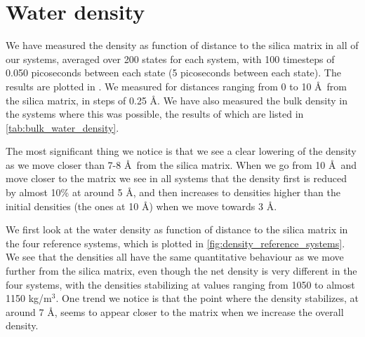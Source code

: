 \section{Water density\label{sec:results_density}}

We have measured the density as function of distance to the silica matrix in all of our systems, averaged over 200 states for each system, with 100 timesteps of 0.050 picoseconds between each state (5 picoseconds between each state). The results are plotted in . We measured for distances ranging from 0 to 10 \AA\ from the silica matrix, in steps of 0.25 \AA. We have also measured the bulk density in the systems where this was possible, the results of which are listed in \cref{tab:bulk_water_density}.

The most significant thing we notice is that we see a clear lowering of the density as we move closer than 7-8 \AA\ from the silica matrix. When we go from 10 \AA\ and move closer to the matrix we see in all systems that the density first is reduced by almost 10\% at around 5 \AA, and then increases to densities higher than the initial densities (the ones at 10 \AA) when we move towards 3 \AA.


We first look at the water density as function of distance to the silica matrix in the four reference systems, which is plotted in \cref{fig:density_reference_systems}. We see that the densities all have the same quantitative behaviour as we move further from the silica matrix, even though the net density is very different in the four systems, with the densities stabilizing at values ranging from 1050 to almost 1150 kg/m$^3$. One trend we notice is that the point where the density stabilizes, at around 7 \AA, seems to appear closer to the matrix when we increase the overall density.

